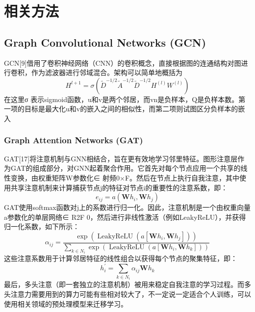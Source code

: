 \documentclass[conference]{IEEEtran}
\begin{document}
\section{相关方法}

\subsection{Graph Convolutional Networks (GCN)}
GCN[9]借用了卷积神经网络（CNN）的卷积概念，直接根据图的连通结构对图进行卷积，作为滤波器进行邻域混合。架构可以简单地概括为
\begin{equation}
H^{l+1}=\sigma\left(\tilde{D}^{-1 / 2} \tilde{A}^{-1 / 2} \tilde{D}^{-1 / 2} H^{(l)} W^{(l)}\right)
\end{equation}
在这里σ 表示sigmoid函数，u和v是两个邻居，而vn是负样本，Q是负样本数。第一项的目标是最大化u和v的嵌入之间的相似性，而第二项则试图区分负样本的嵌入

\subsubsection{Graph Attention Networks (GAT)}
GAT[17]将注意机制与GNN相结合，旨在更有效地学习邻里特征。图形注意层作为GAT的组成部分，对GNN起着聚合作用。它首先对每个节点应用一个共享的线性变换，由权重矩阵W参数化∈ 射频0×F。然后在节点上执行自我注意，其中使用共享注意机制来计算捕获节点j的特征对节点i的重要性的注意系数，即：
\begin{equation}
e_{i j}=a\left(\mathbf{W} h_{i}, \mathbf{W} h_{j}\right)
\end{equation}
GAT使用softmax函数对j上的系数进行归一化。因此，注意机制是一个由权重向量a参数化的单层网络∈ R2F 0，然后进行非线性激活（例如LeakyReLU），并获得归一化系数，如下所示：
\begin{equation}
\alpha_{i j}=\frac{\exp \left(\operatorname{LeakyReLU}\left(a\left[\mathbf{W} h_{i}, \mathbf{W} h_{j}\right]\right)\right)}{\sum_{k \in N_{i}} \exp \left(\operatorname{LeakyReLU}\left(a\left[\mathbf{W} h_{i}, \mathbf{W} h_{k}\right]\right)\right)}
\end{equation}
这些注意系数用于计算邻居特征的线性组合以获得每个节点的聚集特征，即：
\begin{equation}
h_{i}^{\prime}=\sum_{k \in N_{i}} \alpha_{i j} \mathbf{W} h_{k}
\end{equation}
最后，多头注意（即一套独立的注意机制）被用来稳定自我注意的学习过程。而多头注意力需要用到的算力可能有些相对较大了，不一定说一定适合个人训练，可以使用相关领域的预处理模型来迁移学习。




% 
\end{document}
